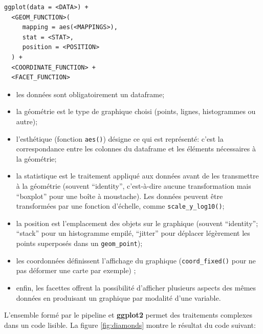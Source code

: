 \documentclass[
  12pt,
  french,
  a4paper,
  extrafontsizes,onecolumn,openright
  ]{memoir}
\providecommand{\tightlist}{%
  \setlength{\itemsep}{0pt}\setlength{\parskip}{0pt}}
\begin{document}
\begin{verbatim}
ggplot(data = <DATA>) + 
  <GEOM_FUNCTION>(
     mapping = aes(<MAPPINGS>),
     stat = <STAT>, 
     position = <POSITION>
  ) +
  <COORDINATE_FUNCTION> +
  <FACET_FUNCTION>
\end{verbatim}

\begin{itemize}
\tightlist
\item
  les données sont obligatoirement un dataframe;
\item
  la géométrie est le type de graphique choisi (points, lignes, histogrammes ou autre);
\item
  l'esthétique (fonction \texttt{aes()}) désigne ce qui est représenté: c'est la correspondance entre les colonnes du dataframe et les éléments nécessaires à la géométrie;
\item
  la statistique est le traitement appliqué aux données avant de les transmettre à la géométrie (souvent \enquote{identity}, c'est-à-dire aucune transformation mais \enquote{boxplot} pour une boîte à moustache).
  Les données peuvent être transformées par une fonction d'échelle, comme \texttt{scale\_y\_log10()};
\item
  la position est l'emplacement des objets sur le graphique (souvent \enquote{identity}; \enquote{stack} pour un histogramme empilé, \enquote{jitter} pour déplacer légèrement les points superposés dans un \texttt{geom\_point});
\item
  les coordonnées définissent l'affichage du graphique (\texttt{coord\_fixed()} pour ne pas déformer une carte par exemple) ;
\item
  enfin, les facettes offrent la possibilité d'afficher plusieurs aspects des mêmes données en produisant un graphique par modalité d'une variable.
\end{itemize}

L'ensemble formé par le pipeline et \textbf{ggplot2} permet des traitements complexes dans un code lisible.
La figure \ref{fig:diamonds} montre le résultat du code suivant:



\scriptsize
\end{document}
